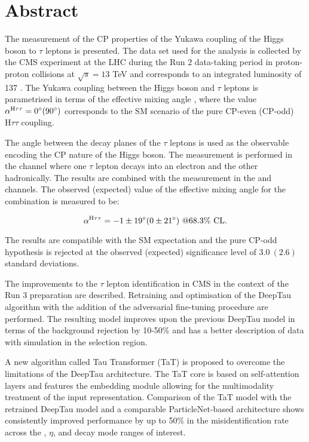 \thispagestyle{empty}
\vspace{-3cm}
\section*{\centering Abstract}

\noindent

The measurement of the CP properties of the Yukawa coupling of the Higgs boson to $\tau$ leptons is presented. The data set used for the analysis is collected by the CMS experiment at the LHC during the Run 2 data-taking period in proton-proton collisions at $\sqrt{s}=13$ TeV and corresponds to an integrated luminosity of 137 \ifb. The Yukawa coupling between the Higgs boson and $\tau$ leptons is parametrised in terms of the effective mixing angle \mixa, where the value $\alpha^{\text{H}\tau\tau} = 0^\circ (90^\circ)$ corresponds to the SM scenario of the pure CP-even (CP-odd) $\text{H}\tau\tau$ coupling. 

The angle between the decay planes of the $\tau$ leptons is used as the observable encoding the CP nature of the Higgs boson. The measurement is performed in the \et channel where one $\tau$ lepton decays into an electron and the other hadronically. The results are combined with the measurement in the \mt and \tata channels. The observed (expected) value of the effective mixing angle for the combination is measured to be:

\begin{equation*}
    \alpha^{\text{H}\tau\tau} = -1 \pm 19^\circ (0 \pm 21^\circ) ~@68.3\% \text{ CL}.
\end{equation*}

The results are compatible with the SM expectation and the pure CP-odd hypothesis is rejected at the observed (expected) significance level of $3.0 ~(2.6)$ standard deviations.

The improvements to the $\tau$ lepton identification in CMS in the context of the Run 3 preparation are described. Retraining and optimisation of the DeepTau algorithm with the addition of the adversarial fine-tuning procedure are performed. The resulting model improves upon the previous DeepTau model in terms of the background rejection by 10-50\% and has a better description of data with simulation in the \htt selection region. 

A new algorithm called Tau Transformer (TaT) is proposed to overcome the limitations of the DeepTau architecture. The TaT core is based on self-attention layers and features the embedding module allowing for the multimodality treatment of the input representation. Comparison of the TaT model with the retrained DeepTau model and a comparable ParticleNet-based architecture shows consistently improved performance by up to 50\% in the misidentification rate across the \pt, $\eta$, and decay mode ranges of interest.   


